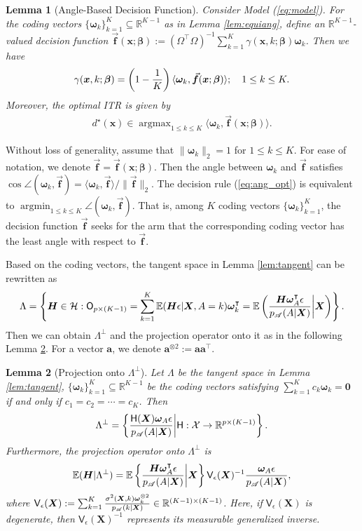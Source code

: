\documentclass[11pt]{article}
\newtheorem{lem}{Lemma}
\theoremstyle{definition}
\theoremstyle{remark}
\newcommand{\ba}{\bm{a}}
\newcommand{\bbf}{\bm{f}}
\newcommand{\bx}{\bm{x}}
\newcommand{\bH}{\bm{H}}
\newcommand{\bX}{\bm{X}}
\newcommand{\bbeta}{\bm{\beta}}
\newcommand{\bomega}{\bm{\omega}}
\newcommand{\bbE}{\mathbb{E}}
\newcommand{\bbR}{\mathbb{R}}
\newcommand{\cH}{\mathcal{H}}
\newcommand{\cX}{\mathcal{X}}
\newcommand{\sA}{\mathscr{A}}
\newcommand{\sfH}{\mathsf{H}}
\newcommand{\sfO}{\mathsf{O}}
\newcommand{\sfV}{\mathsf{V}}
\newcommand{\argmin}{\mathop{\mathrm{argmin}}}
\newcommand{\argmax}{\mathop{\mathrm{argmax}}}
\newcommand{\bzero}{\mathbf{0}}	%
\begin{document}
\begin{lem}[Angle-Based Decision Function]\label{lem:ang}
	Consider Model (\ref{eq:model}). For the coding vectors $ \{\bomega_{k}\}_{k=1}^{K} \subseteq \bbR^{K-1} $ as in Lemma \ref{lem:equiang}, define an $ \bbR^{K-1} $-valued decision function $ \vec{\bbf}(\bx;\bbeta) := (\Omega^{\intercal}\Omega)^{-1}\sum_{k=1}^{K}\gamma(\bx,k;\bbeta)\bomega_{k} $. Then we have
	\[ \gamma(\bx,k;\bbeta) = \left( 1 - {1 \over K} \right)\langle \bomega_{k},\vec{\bbf}(\bx;\bbeta) \rangle; \quad 1 \le k \le K. \]
	Moreover, the optimal ITR is given by
	\begin{align}
		d^{\star}(\bx) \in \argmax_{1 \le k \le K}\langle \bomega_{k},\vec{\bbf}(\bx;\bbeta) \rangle.\label{eq:ang_opt}
	\end{align}
\end{lem}

Without loss of generality, assume that $ \| \bomega_{k} \|_{2} = 1 $ for $ 1 \le k \le K $. For ease of notation, we denote $ \vec{\bbf} = \vec{\bbf}(\bx;\bbeta) $. Then the angle between $ \bomega_{k} $ and $ \vec{\bbf} $ satisfies $ \cos\angle(\bomega_{k},\vec{\bbf}) = \langle \bomega_{k},\vec{\bbf} \rangle/\| \vec{\bbf} \|_{2} $. The decision rule (\ref{eq:ang_opt}) is equivalent to $ \argmin_{1 \le k \le K}\angle(\bomega_{k},\vec{\bbf}) $. That is, among $ K $ coding vectors $ \{\bomega_{k}\}_{k=1}^{K} $, the decision function $ \vec{\bbf} $ seeks for the arm that the corresponding coding vector has the least angle with respect to $ \vec{\bbf} $.

Based on the coding vectors, the tangent space in Lemma \ref{lem:tangent} can be rewritten as
\[ \Lambda = \left\{ \bH \in \cH: \sfO_{p\times(K-1)} = \sum_{k=1}^{K}\bbE(\bH\epsilon|\bX,A=k)\bomega_{k}^{\intercal} = \bbE\left( {\bH\bomega_{A}^{\intercal}\epsilon \over p_{\sA}(A|\bX)}\middle|\bX \right) \right\}. \]
Then we can obtain $ \Lambda^{\perp} $ and the projection operator onto it as in the following Lemma \ref{lem:tangent_proj}. For a vector $ \ba $, we denote $ \ba^{\otimes 2} := \ba\ba^{\intercal} $. 

\begin{lem}[Projection onto $ \Lambda^{\perp} $]\label{lem:tangent_proj}
	Let $ \Lambda $ be the tangent space in Lemma \ref{lem:tangent}, $ \{ \bomega_{k} \}_{k=1}^{K} \subseteq \bbR^{K-1} $ be the coding vectors satisfying $ \sum_{k=1}^{K}c_{k}\bomega_{k} = \bzero $ if and only if $ c_{1} = c_{2} = \cdots = c_{K} $. Then
	\[ \Lambda^{\perp} = \left \{{\sfH(\bX)\bomega_{A}\epsilon \over p_{\sA}(A|\bX)}\middle|\sfH:\cX\to \bbR^{p\times(K-1)} \right \}. \]
	Furthermore, the projection operator onto $ \Lambda^{\perp} $ is
	\[ \bbE(\bH|\Lambda^{\perp}) = \bbE\left\{ {\bH\bomega_{A}^{\intercal}\epsilon \over p_{\sA}(A|\bX)}\middle|\bX \right\}\sfV_{\epsilon}(\bX)^{-1}{\bomega_{A}\epsilon \over p_{\sA}(A|\bX)}, \]
	where $ \sfV_{\epsilon}(\bX) := \sum_{k=1}^{K}{\sigma^{2}(\bX,k)\bomega_{k}^{\otimes 2} \over p_{\sA}(k|\bX)} \in \bbR^{(K-1)\times(K-1)} $. Here, if $ \sfV_{\epsilon}(\bX) $ is degenerate, then $ \sfV_{\epsilon}(\bX)^{-1} $ represents its measurable generalized inverse.
\end{lem}
\end{document}
